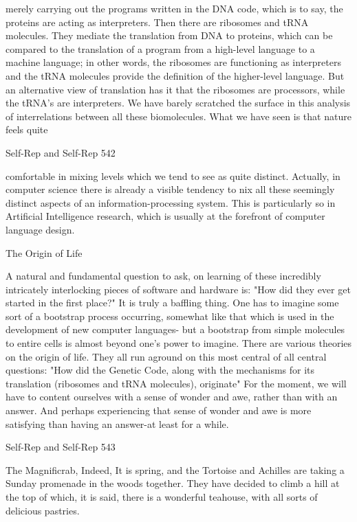 {merely carrying out the programs written in the DNA code, which is to say, the proteins are
acting as interpreters.
         Then there are ribosomes and tRNA molecules. They mediate the translation from
DNA to proteins, which can be compared to the translation of a program from a high-level
language to a machine language; in other words, the ribosomes are functioning as interpreters
and the tRNA molecules provide the definition of the higher-level language. But an
alternative view of translation has it that the ribosomes are processors, while the tRNA's are
interpreters.
         We have barely scratched the surface in this analysis of interrelations between all
these biomolecules. What we have seen is that nature feels quite




Self-Rep and Self-Rep                                                                        542

comfortable in mixing levels which we tend to see as quite distinct. Actually, in computer
science there is already a visible tendency to nix all these seemingly distinct aspects of an
information-processing system. This is particularly so in Artificial Intelligence research,
which is usually at the forefront of computer language design.

                                    The Origin of Life

A natural and fundamental question to ask, on learning of these incredibly intricately
interlocking pieces of software and hardware is: "How did they ever get started in the first
place?" It is truly a baffling thing. One has to imagine some sort of a bootstrap process
occurring, somewhat like that which is used in the development of new computer languages-
but a bootstrap from simple molecules to entire cells is almost beyond one's power to
imagine. There are various theories on the origin of life. They all run aground on this most
central of all central questions: "How did the Genetic Code, along with the mechanisms for
its translation (ribosomes and tRNA molecules), originate" For the moment, we will have to
content ourselves with a sense of wonder and awe, rather than with an answer. And perhaps
experiencing that sense of wonder and awe is more satisfying than having an answer-at least
for a while.




Self-Rep and Self-Rep                                                                    543

                         The Magnificrab, Indeed,
      It is spring, and the Tortoise and Achilles are taking a Sunday promenade in
      the woods together. They have decided to climb a hill at the top of which, it is
      said, there is a wonderful teahouse, with all sorts of delicious pastries.

}
